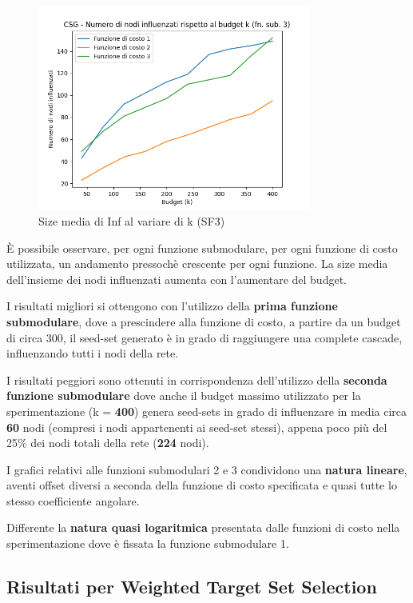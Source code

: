 \begin{figure}[hbtp]
    \centering
    \includegraphics[width=0.8\textwidth]{images/csg_submodular_function_2.png}
    \caption*{Size media di Inf al variare di k (SF3)}
    \label{fig:third}
\end{figure}

È possibile osservare, per ogni funzione submodulare, per ogni funzione di costo utilizzata, un andamento pressochè crescente per ogni funzione. La size media dell'insieme dei nodi influenzati aumenta con l'aumentare del budget. 

I risultati migliori si ottengono con l'utilizzo della \textbf{prima funzione submodulare}, dove a prescindere alla funzione di costo, a partire da un budget di circa 300, il seed-set generato è in grado di raggiungere una complete cascade, influenzando tutti i nodi della rete.

I risultati peggiori sono ottenuti in corrispondenza dell'utilizzo della \textbf{seconda funzione submodulare} dove anche il budget massimo utilizzato per la sperimentazione (k = \textbf{400}) genera seed-sets in grado di influenzare in media circa \textbf{60} nodi (compresi i nodi appartenenti ai seed-set stessi), appena poco più del 25\% dei nodi totali della rete (\textbf{224} nodi).

I grafici relativi alle funzioni submodulari 2 e 3 condividono una \textbf{natura lineare}, aventi offset diversi a seconda della funzione di costo specificata e quasi tutte lo stesso coefficiente angolare.

Differente la \textbf{natura quasi logaritmica} presentata dalle funzioni di costo nella sperimentazione dove è fissata la funzione submodulare 1.


\subsection{Risultati per Weighted Target Set Selection}

